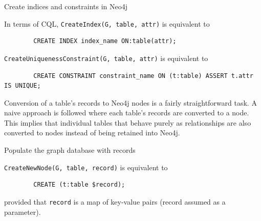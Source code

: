 \documentclass[12pt]{article}
\begin{document}
    \begin{algorithm}[htb!]
        \SetAlgoLined
        \caption{Create indices and constraints in Neo4j}
        \label{algo:sql_create_index}
    \end{algorithm}

    \FloatBarrier

    In terms of CQL, \verb|CreateIndex(G, table, attr)| is equivalent to 
    \begin{lstlisting}
        CREATE INDEX index_name ON:table(attr);
    \end{lstlisting}
    \verb|CreateUniquenessConstraint(G, table, attr)| is equivalent to 
    \begin{lstlisting}
        CREATE CONSTRAINT constraint_name ON (t:table) ASSERT t.attr IS UNIQUE;
    \end{lstlisting}

    Conversion of a table's records to Neo4j nodes is a fairly straightforward task. A naive approach is followed where each table's records are converted to a node. This implies that individual tables that behave purely as relationships are also converted to nodes instead of being retained into Neo4j.

    \begin{algorithm}[htb!]
        \SetAlgoLined
        \caption{Populate the graph database with records}
        \label{algo:sql2graph}
    \end{algorithm}

    \verb|CreateNewNode(G, table, record)| is equivalent to 
    \begin{lstlisting}
        CREATE (t:table $record);
    \end{lstlisting}
    provided that \verb|record| is a map of key-value pairs (record assumed as a parameter).
\end{document}
